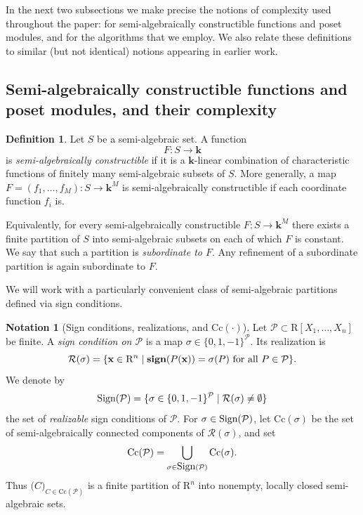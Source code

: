 \documentclass{amsart}[10pts]
\theoremstyle{definition}
\newtheorem{definition}{Definition}[section]
\newtheorem{notation}{Notation}[section]
\theoremstyle{remark}
\theoremstyle{observation}
\numberwithin{equation}{section}
\newcommand {\sign} {\mbox{\bf sign}}
\newcommand {\R} {\mathrm{R}}
\newcommand {\kk}         {\mathbf{k}}
\newcommand {\RR} {{\mathcal R}}
\newcommand {\Sign}      {\mbox{\rm Sign}}
\newcommand{\x}{\mathbf{x}}
\newcommand{\Cc}{\mathrm{Cc}}
\begin{document}
In the next two subsections we make precise the notions of complexity used throughout the paper: for semi-algebraically constructible functions and poset modules, and for the algorithms that we employ. We also relate these definitions to similar (but not identical) notions appearing in earlier work.

\subsection{Semi-algebraically constructible functions and poset modules, and their complexity}
\label{subsec:complexity:functions}

\begin{definition}
\label{def:sa-constr-functions}
Let $S$ be a semi-algebraic set. A function
\[
F:S\to \kk
\]
is \emph{semi-algebraically constructible} if it is a $\kk$-linear combination of characteristic functions of finitely many semi-algebraic subsets of $S$.
More generally, a map $F=(f_1,\ldots,f_M):S\to \kk^M$ is semi-algebraically constructible if each coordinate function $f_i$ is.
\end{definition}

Equivalently, for every semi-algebraically constructible $F:S\to\kk^M$ there exists a finite partition of $S$ into semi-algebraic subsets on each of which $F$ is constant. We say that such a partition is \emph{subordinate to $F$}. Any refinement of a subordinate partition is again subordinate to $F$.

\medskip
We will work with a particularly convenient class of semi-algebraic partitions defined via sign conditions.

\begin{notation}[Sign conditions, realizations, and $\Cc(\cdot)$]
\label{not:sign-condition}
Let $\mathcal P\subset \R[X_1,\ldots,X_n]$ be finite. A \emph{sign condition on $\mathcal P$} is a map $\sigma\in\{0,1,-1\}^{\mathcal P}$.
Its realization is
\[
\RR(\sigma)=\{\x\in \R^n \mid \sign(P(\x))=\sigma(P)\ \text{for all }P\in \mathcal P\}.
\]
We denote by
\[
\Sign(\mathcal P)=\{\sigma\in \{0,1,-1\}^{\mathcal P}\mid \RR(\sigma)\neq \emptyset\}
\]
the set of \emph{realizable} sign conditions of $\mathcal P$.
For $\sigma\in \Sign(\mathcal P)$, let $\Cc(\sigma)$ be the set of semi-algebraically connected components of $\RR(\sigma)$, and set
\[
\Cc(\mathcal P)=\bigcup_{\sigma\in \Sign(\mathcal P)} \Cc(\sigma).
\]
Thus $\bigl(C\bigr)_{C\in \Cc(\mathcal P)}$ is a finite partition of $\R^n$ into nonempty, locally closed semi-algebraic sets.
\end{notation}
\end{document}
